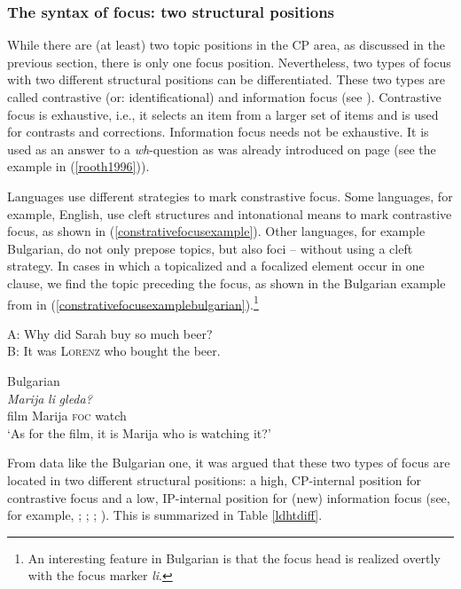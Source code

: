 \subsubsection{The syntax of focus: two structural positions}
While there are (at least) two topic positions in the CP area, as discussed in the previous section, there is only one focus position. Nevertheless, two types of focus with two different structural positions can be differentiated. These two types are called contrastive (or: identificational) and information focus (see \citealt{kiss1981structural}). Contrastive focus is exhaustive, i.e., it selects an item from a larger set of items and is used for contrasts and corrections. Information focus needs not be exhaustive. It is used as an answer to a \textit{wh}-question as was already introduced on page \pageref{rooth1996} (see the example in (\ref{rooth1996})).

Languages use different strategies to mark constrastive focus. Some languages, for example, English, use cleft structures and intonational means to mark contrastive focus, as shown in (\ref{constrativefocusexample}). Other languages, for example Bulgarian, do not only prepose topics, but also foci -- without using a cleft strategy. In cases in which a topicalized and a focalized element occur in one clause, we find the topic preceding the focus, as shown in the Bulgarian example from \citet[72]{van1995focus} in (\ref{constrativefocusexamplebulgarian}).\footnote{An interesting feature in Bulgarian is that the focus head is realized overtly with the focus marker \textit{li}. }

\begin{exe}
\ex A: Why did Sarah buy so much beer?\\
B: It was \textsc{Lorenz} who bought the beer. \label{constrativefocusexample}
\end{exe}

\begin{exe}
\ex Bulgarian \citep[72]{van1995focus} \\  {\textit{Marija}} {\textit{li}} {\textit{gleda?}}  \\
{film} {Marija} {\textsc{foc}} {watch} \\
\trans `As for the film, it is Marija who is watching it?'   \label{constrativefocusexamplebulgarian}
\end{exe}

\noindent From data like the Bulgarian one, it was argued that these two types of focus are located in two different structural positions: a high, CP-internal position for contrastive focus and a low, IP-internal position for (new) information focus (see, for example, \citealt{beninca2001position}; \citealt{benincapol2004topic}; \citealt{belletti2004aspects}; \citealt{belletti2003i}). This is summarized in Table \ref{ldhtdiff}.

